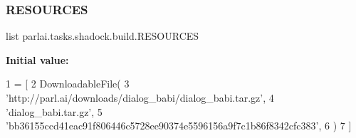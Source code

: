 \subsubsection{\texorpdfstring{R\+E\+S\+O\+U\+R\+C\+ES}{RESOURCES}}
{\footnotesize\ttfamily list parlai.\+tasks.\+shadock.\+build.\+R\+E\+S\+O\+U\+R\+C\+ES}

{\bfseries Initial value\+:}
\begin{DoxyCode}
1 =  [
2     DownloadableFile(
3         \textcolor{stringliteral}{'http://parl.ai/downloads/dialog\_babi/dialog\_babi.tar.gz'},
4         \textcolor{stringliteral}{'dialog\_babi.tar.gz'},
5         \textcolor{stringliteral}{'bb36155ccd41eac91f806446c5728ee90374e5596156a9f7c1b86f8342cfc383'},
6     )
7 ]
\end{DoxyCode}
